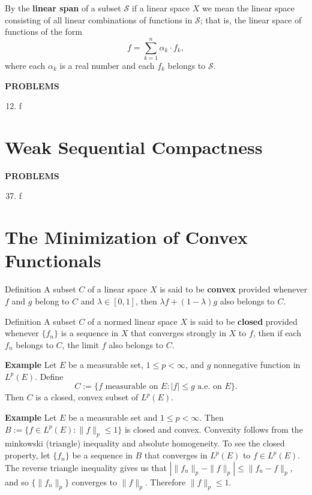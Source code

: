 By the \textbf{linear span} of a subset $\mathcal{S}$ if a linear space $X$ we mean the linear space consisting of all linear combinations of functions in $\mathcal{S}$;
that is, the linear space of functions of the form 
\[
    f=\sum_{k=1}^n\alpha_k\cdot f_k,
\]
where each $\alpha_k$ is a real number and each $f_k$ belongs to $\mathcal{S}$.

\begin{center}
	\textbf{PROBLEMS}
\end{center}
\begin{enumerate}
	\setcounter{enumi}{11}
    \item f
\end{enumerate}

\section{Weak Sequential Compactness}
\begin{center}
	\textbf{PROBLEMS}
\end{center}
\begin{enumerate}
	\setcounter{enumi}{36}
    \item f
\end{enumerate}

\section{The Minimization of Convex Functionals}

\begin{namedthm*}{Definition}
    A subset $C$ of a linear space $X$ is said to be \textbf{convex} provided whenever $f$ and $g$ belong to $C$ and $\lambda\in[0,1]$, then $\lambda f+(1-\lambda)g$ also belongs to $C$.
\end{namedthm*}

\begin{namedthm*}{Definition}
    A subset $C$ of a normed linear space $X$ is said to be \textbf{closed} provided whenever $\{f_n\}$ is a sequence in $X$ that converges strongly in $X$ to $f$, then if each $f_n$ belongs to $C$, the limit $f$ also belongs to $C$.
\end{namedthm*}

\textbf{Example}
Let $E$ be a measurable set, $1\le p<\infty$, and $g$ nonnegative function in $L^p(E)$.
Define
\[
    C:=\{f\text{ measurable on }E: |f|\le g\text{ a.e. on }E\}.
\]
Then $C$ is a closed, convex subset of $L^p(E)$.

\textbf{Example}
Let $E$ be a measurable set and $1\le p<\infty$.
Then $B:=\{f\in L^p(E):\|f\|_p\le1\}$ is closed and convex.
Convexity follows from the minkowski (triangle) inequality and absolute homogeneity.
To see the closed property, let $\{f_n\}$ be a sequence in $B$ that converges in $L^p(E)$ to $f\in L^p(E)$.
The reverse triangle inequality gives us that $|\|f_n\|_p-\|f\|_p|\le\|f_n-f\|_p$, and so $\{\|f_n\|_p\}$ converges to $\|f\|_p$.
Therefore $\|f\|_p\le1$.

